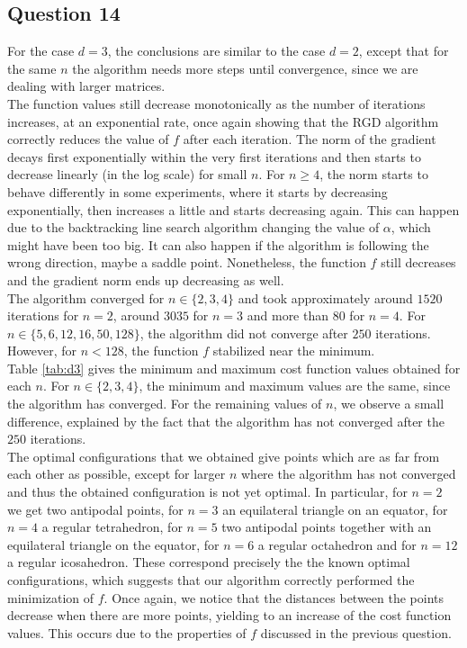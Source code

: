 \documentclass{article}
\begin{document}
\subsection*{Question 14}
For the case $d=3$, the conclusions are similar to the case $d=2$, except that for the same $n$ the algorithm needs more steps until convergence, since we are dealing with larger matrices.\\
The function values still decrease monotonically as the number of iterations increases, at an exponential rate, once again showing that the RGD algorithm correctly reduces the value of $f$ after each iteration. The norm of the gradient decays first exponentially within the very first iterations and then starts to decrease linearly (in the log scale) for small $n$. For $n\geq 4$, the norm starts to behave differently in some experiments, where it starts by decreasing exponentially, then increases a little and starts decreasing again. This can happen due to the backtracking line search algorithm changing the value of $\alpha$, which might have been too big. It can also happen if the algorithm is following the wrong direction, maybe a saddle point. Nonetheless, the function $f$ still decreases and the gradient norm ends up decreasing as well.\\
The algorithm converged for $n\in\{2, 3, 4\}$ and took approximately around $15$\textendash$20$ iterations for $n=2$, around $30$\textendash$35$ for $n=3$ and more than $80$ for $n=4$. For $n\in\{5, 6, 12, 16, 50, 128\}$, the algorithm did not converge after $250$ iterations. However, for $n<128$, the function $f$ stabilized near the minimum.\\
Table \ref{tab:d3} gives the minimum and maximum cost function values obtained for each $n$. For $n\in\{2, 3, 4\}$, the minimum and maximum values are the same, since the algorithm has converged. For the remaining values of $n$, we observe a small difference, explained by the fact that the algorithm has not converged after the $250$ iterations.\\
The optimal configurations that we obtained give points which are as far from each other as possible, except for larger $n$ where the algorithm has not converged and thus the obtained configuration is not yet optimal. In particular, for $n=2$ we get two antipodal points, for $n=3$ an equilateral triangle on an equator, for $n=4$ a regular tetrahedron, for $n=5$ two antipodal points together with an equilateral triangle on the equator, for $n=6$ a regular octahedron and for $n=12$ a regular icosahedron. These correspond precisely the the known optimal configurations, which suggests that our algorithm correctly performed the minimization of $f$. Once again, we notice that the distances between the points decrease when there are more points, yielding to an increase of the cost function values. This occurs due to the properties of $f$ discussed in the previous question.\\
\end{document}
